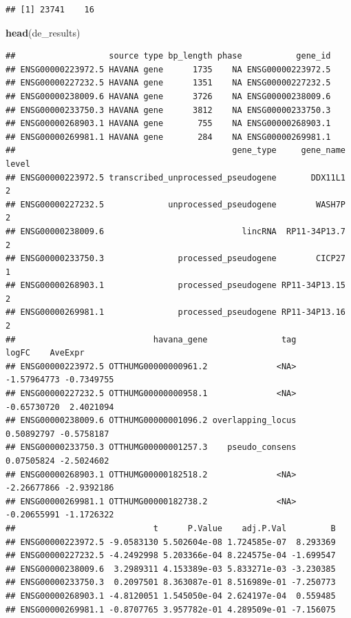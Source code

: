 \documentclass[
]{article}
\newenvironment{Shaded}{\begin{snugshade}}{\end{snugshade}}
\newcommand{\FunctionTok}[1]{\textcolor[rgb]{0.13,0.29,0.53}{\textbf{#1}}}
\newcommand{\NormalTok}[1]{#1}
\begin{document}
\begin{verbatim}
## [1] 23741    16
\end{verbatim}

\begin{Shaded}
\begin{Highlighting}[]
\FunctionTok{head}\NormalTok{(de\_results)}
\end{Highlighting}
\end{Shaded}

\begin{verbatim}
##                   source type bp_length phase           gene_id
## ENSG00000223972.5 HAVANA gene      1735    NA ENSG00000223972.5
## ENSG00000227232.5 HAVANA gene      1351    NA ENSG00000227232.5
## ENSG00000238009.6 HAVANA gene      3726    NA ENSG00000238009.6
## ENSG00000233750.3 HAVANA gene      3812    NA ENSG00000233750.3
## ENSG00000268903.1 HAVANA gene       755    NA ENSG00000268903.1
## ENSG00000269981.1 HAVANA gene       284    NA ENSG00000269981.1
##                                            gene_type     gene_name level
## ENSG00000223972.5 transcribed_unprocessed_pseudogene       DDX11L1     2
## ENSG00000227232.5             unprocessed_pseudogene        WASH7P     2
## ENSG00000238009.6                            lincRNA  RP11-34P13.7     2
## ENSG00000233750.3               processed_pseudogene        CICP27     1
## ENSG00000268903.1               processed_pseudogene RP11-34P13.15     2
## ENSG00000269981.1               processed_pseudogene RP11-34P13.16     2
##                            havana_gene               tag       logFC    AveExpr
## ENSG00000223972.5 OTTHUMG00000000961.2              <NA> -1.57964773 -0.7349755
## ENSG00000227232.5 OTTHUMG00000000958.1              <NA> -0.65730720  2.4021094
## ENSG00000238009.6 OTTHUMG00000001096.2 overlapping_locus  0.50892797 -0.5758187
## ENSG00000233750.3 OTTHUMG00000001257.3    pseudo_consens  0.07505824 -2.5024602
## ENSG00000268903.1 OTTHUMG00000182518.2              <NA> -2.26677866 -2.9392186
## ENSG00000269981.1 OTTHUMG00000182738.2              <NA> -0.20655991 -1.1726322
##                            t      P.Value    adj.P.Val         B
## ENSG00000223972.5 -9.0583130 5.502604e-08 1.724585e-07  8.293369
## ENSG00000227232.5 -4.2492998 5.203366e-04 8.224575e-04 -1.699547
## ENSG00000238009.6  3.2989311 4.153389e-03 5.833271e-03 -3.230385
## ENSG00000233750.3  0.2097501 8.363087e-01 8.516989e-01 -7.250773
## ENSG00000268903.1 -4.8120051 1.545050e-04 2.624197e-04  0.559485
## ENSG00000269981.1 -0.8707765 3.957782e-01 4.289509e-01 -7.156075
\end{verbatim}
\end{document}
